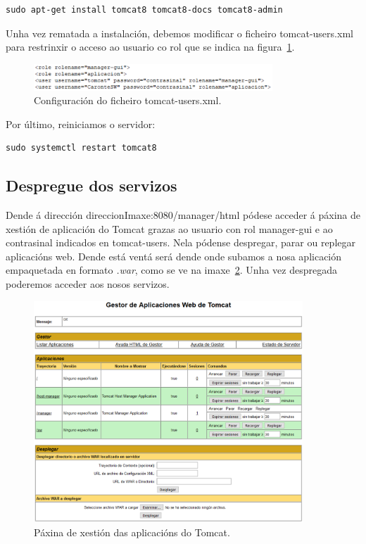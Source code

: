 \begin{lstlisting}
sudo apt-get install tomcat8 tomcat8-docs tomcat8-admin
\end{lstlisting}

Unha vez rematada a instalación, debemos modificar o ficheiro tomcat-users.xml para restrinxir o acceso ao usuario co rol que se indica na figura~\ref{fig:tomcatUsers}.

\begin{figure}[h]
	\begin{center}
		\includegraphics[width=0.8\textwidth]{figures/capturas/tomcatUsers}
		\caption{Configuración do ficheiro tomcat-users.xml.}
		\label{fig:tomcatUsers}
	\end{center}
\end{figure}

Por último, reiniciamos o servidor:

\begin{lstlisting}
sudo systemctl restart tomcat8
\end{lstlisting}

\subsection{Despregue dos servizos}
Dende á dirección direccionImaxe:8080/manager/html pódese acceder á páxina de xestión de aplicación do Tomcat grazas ao usuario con rol manager-gui e ao contrasinal indicados en tomcat-users. Nela pódense despregar, parar ou replegar aplicacións web. Dende está ventá será dende onde subamos a nosa aplicación empaquetada en formato \emph{.war}, como se ve na imaxe~\ref{fig:tomcatXestor}. Unha vez despregada poderemos acceder aos nosos servizos.

\begin{figure}[h]
	\begin{center}
		\includegraphics[width=0.9\textwidth]{figures/capturas/tomcatXestor}
		\caption{Páxina de xestión das aplicacións do Tomcat.}
		\label{fig:tomcatXestor}
	\end{center}
\end{figure}


